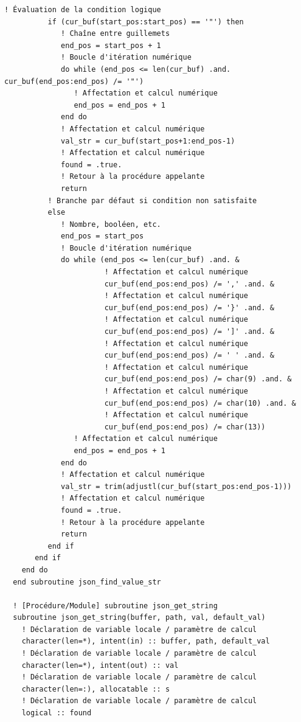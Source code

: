 \documentclass[10pt,a4paper,oneside]{book}
\begin{document}
\begin{lstlisting}[language={[95]Fortran}]
          ! Évaluation de la condition logique
          if (cur_buf(start_pos:start_pos) == '"') then
             ! Chaîne entre guillemets
             end_pos = start_pos + 1
             ! Boucle d'itération numérique
             do while (end_pos <= len(cur_buf) .and. cur_buf(end_pos:end_pos) /= '"')
                ! Affectation et calcul numérique
                end_pos = end_pos + 1
             end do
             ! Affectation et calcul numérique
             val_str = cur_buf(start_pos+1:end_pos-1)
             ! Affectation et calcul numérique
             found = .true.
             ! Retour à la procédure appelante
             return
          ! Branche par défaut si condition non satisfaite
          else
             ! Nombre, booléen, etc.
             end_pos = start_pos
             ! Boucle d'itération numérique
             do while (end_pos <= len(cur_buf) .and. &
                       ! Affectation et calcul numérique
                       cur_buf(end_pos:end_pos) /= ',' .and. &
                       ! Affectation et calcul numérique
                       cur_buf(end_pos:end_pos) /= '}' .and. &
                       ! Affectation et calcul numérique
                       cur_buf(end_pos:end_pos) /= ']' .and. &
                       ! Affectation et calcul numérique
                       cur_buf(end_pos:end_pos) /= ' ' .and. &
                       ! Affectation et calcul numérique
                       cur_buf(end_pos:end_pos) /= char(9) .and. &
                       ! Affectation et calcul numérique
                       cur_buf(end_pos:end_pos) /= char(10) .and. &
                       ! Affectation et calcul numérique
                       cur_buf(end_pos:end_pos) /= char(13))
                ! Affectation et calcul numérique
                end_pos = end_pos + 1
             end do
             ! Affectation et calcul numérique
             val_str = trim(adjustl(cur_buf(start_pos:end_pos-1)))
             ! Affectation et calcul numérique
             found = .true.
             ! Retour à la procédure appelante
             return
          end if
       end if
    end do
  end subroutine json_find_value_str

  ! [Procédure/Module] subroutine json_get_string
  subroutine json_get_string(buffer, path, val, default_val)
    ! Déclaration de variable locale / paramètre de calcul
    character(len=*), intent(in) :: buffer, path, default_val
    ! Déclaration de variable locale / paramètre de calcul
    character(len=*), intent(out) :: val
    ! Déclaration de variable locale / paramètre de calcul
    character(len=:), allocatable :: s
    ! Déclaration de variable locale / paramètre de calcul
    logical :: found


\end{lstlisting}
\end{document}
